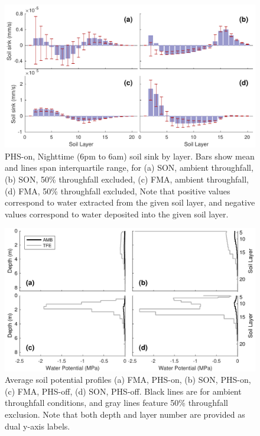\documentclass[draft,linenumbers]{agujournal}
\begin{document}
    \clearpage
    \begin{figure}[h]
     \centering
     \includegraphics[width=30pc]{../figs/fig10.pdf}
     \caption{PHS-on, Nighttime (6pm to 6am)  soil sink by layer.
          Bars show mean and lines span interquartile range, for 
     (a) SON, ambient throughfall,
     (b) SON, 50\% throughfall excluded,
     (c) FMA, ambient throughfall,
     (d) FMA, 50\% throughfall excluded,
     Note that positive values correspond to water extracted from the given soil layer, 
     and negative values correspond to water deposited into the given soil layer.}
     \label{fig10}
  \end{figure}
  
      \clearpage
    \begin{figure}[h]
     \centering
     \includegraphics[width=30pc]{../figs/fig11.pdf}
     \caption{Average soil potential profiles
     (a) FMA, PHS-on,
     (b) SON, PHS-on,
     (c) FMA, PHS-off,
     (d) SON, PHS-off.
     Black lines are for ambient throughfall conditions, and gray lines feature 50\% throughfall exclusion.
     Note that both depth and layer number are provided as dual y-axis labels.  }
     \label{fig11}
  \end{figure}
  
\end{document}
